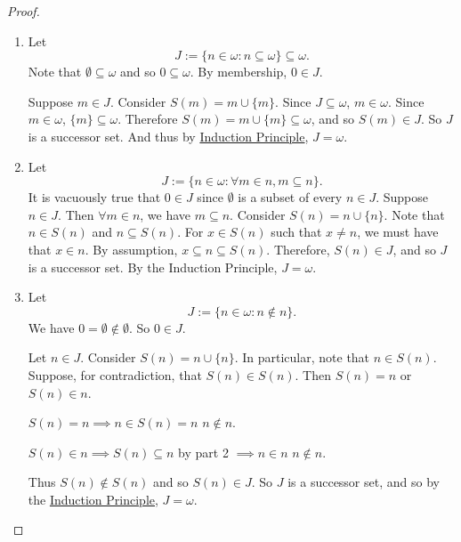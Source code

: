 \documentclass[notoc,notitlepage]{tufte-book}
\begin{document}
\begin{proof}
  \begin{enumerate}
    \item Let
      \begin{equation*}
        J := \{ n \in \omega : n \subseteq \omega \} \subseteq \omega.
      \end{equation*}
      Note that $\emptyset \subseteq \omega$ and so $0 \subseteq \omega$. By membership, $0 \in J$.
      
      Suppose $m \in J$. Consider $S(m) = m \cup \{ m \}$. Since $J \subseteq \omega$, $m \in \omega$. Since $m \in \omega$, $\{ m \} \subseteq \omega$. Therefore $S(m) = m \cup \{ m \} \subseteq \omega$, and so $S(m) \in J$. So $J$ is a successor set. And thus by \hyperref[thm:induction_principle]{Induction Principle}, $J = \omega$.

    \item Let
      \begin{equation*}
        J := \{ n \in \omega: \forall m \in n, m \subseteq n \}.
      \end{equation*}
      It is vacuously true that $0 \in J$ since $\emptyset$ is a subset of every $n \in J$. Suppose $n \in J$. Then $\forall m \in n$, we have $m \subseteq n$. Consider $S(n) = n \cup \{ n \}$. Note that $n \in S(n)$ and $n \subseteq S(n)$. For $x \in S(n)$ such that $x \neq n$, we must have that $x \in n$. By assumption, $x \subseteq n \subseteq S(n)$. Therefore, $S(n) \in J$, and so $J$ is a successor set. By the Induction Principle, $J = \omega$.

    \item Let
      \begin{equation*}
        J := \{ n \in \omega : n \notin n \}.
      \end{equation*}
      We have $0 = \emptyset \notin \emptyset$. So $0 \in J$.

      Let $n \in J$. Consider $S(n) = n \cup \{n\}$. In particular, note that $n \in S(n)$. Suppose, for contradiction, that $S(n) \in S(n)$. Then $S(n) = n$ or $S(n) \in n$.

      $S(n) = n \implies n \in S(n) = n$ \Lightning $n \notin n$.

      $S(n) \in n \implies S(n) \subseteq n$ by part 2 $\implies n \in n$ \Lightning $n \notin n$.

      Thus $S(n) \notin S(n)$ and so $S(n) \in J$. So $J$ is a successor set, and so by the \hyperref[thm:induction_principle]{Induction Principle}, $J = \omega$.


\end{enumerate}
\end{proof}
\end{document}

